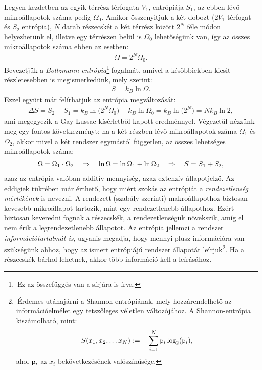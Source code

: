 Legyen kezdetben az egyik térrész térfogata $V_1$, entrópiája $S_1$, az ebben lévő mikroállapotok száma pedig $\Omega_0$. Amikor összenyitjuk a két dobozt ($2V_1$ térfogat és $S_2$ entrópia), $N$ darab részecskét a két térrész között $2^N$ féle módon helyezhetünk el, illetve egy térrészen belül is $\Omega_0$ lehetőségünk van, így az összes mikroállapotok száma ebben az esetben:
\begin{align}
	\Omega = 2^N\Omega_0.
\end{align}
Bevezetjük a \emph{Boltzmann-entrópia}\footnote{\,Ez az összefüggés van a sírjára is írva.} fogalmát, amivel a későbbiekben kicsit részletesebben is megismerkedünk, mely szerint:
\begin{align}
	S = k_B\ln\Omega.
\end{align}
Ezzel együtt már felírhatjuk az entrópia megváltozását:
\begin{align}
	\Delta S = S_2-S_1 =k_B\ln\big(2^N\Omega_0\big) - k_B\ln\Omega_0 = k_B\ln\big(2^N\big)= Nk_B\ln 2,
\end{align}
ami megegyezik a Gay-Lussac-kísérletből kapott eredménnyel. Végezetül nézzünk meg egy fontos következményt: ha a két részben lévő mikroállapotok száma $\Omega_1$ és $\Omega_2$, akkor mivel a két rendszer egymástól független, az összes lehetséges mikroállapotok száma:
\begin{align}\label{eq:mikroallapotok}
	\Omega = \Omega_1\cdot \Omega_2\quad\Rightarrow\quad \ln\Omega = \ln\Omega_1 + \ln\Omega_2 \quad\Rightarrow\quad S = S_1+S_2,
\end{align}
azaz az entrópia valóban additív mennyiség, azaz extenzív állapotjelző.
Az eddigiek tükrében már érthető, hogy miért szokás az entrópiát a \emph{rendezetlenség mértékének} is nevezni. A rendezett (szabály szerinti) makroállapothoz biztosan kevesebb mikroállapot tartozik, mint egy rendezetlenebb állapothoz. Ezért biztosan keveredni fognak a részecskék, a rendezetlenségük növekszik, amíg el nem érik a legrendezetlenebb állapotot. Az entrópia jellemzi a rendszer \emph{információtartalmát is}, ugyanis megadja, hogy mennyi plusz információra van szükségünk ahhoz, hogy az ismert entrópiájú rendszer állapotát leírjuk\footnote{\,Érdemes utánajárni a Shannon-entrópiának, mely hozzárendelhető az információelmélet egy tetszőleges véletlen változójához. A Shannon-entrópia kiszámolható, mint:
$$S(x_1,x_2,\dots x_N):=-\sum_{i=1}^N \mathtt p_i\log_2(\mathtt p_i),$$
ahol $\mathtt p_i$ az $x_i$ bekövetkezésének valószínűsége.}. Ha a részecskék bárhol lehetnek, akkor több információ kell a leírásához.

